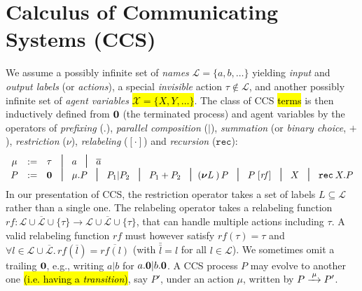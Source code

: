 
\section{Calculus of Communicating Systems (CCS)}
\label{ss:ccs}

We assume a possibly infinite set of \emph{names} $\mathscr{L} = \{a, b,
\ldots\}$ yielding \emph{input} and \emph{output labels} (or
\emph{actions}), a special \emph{invisible}
action $\tau \notin \mathscr{L}$, and another possibly infinite
set of \emph{agent variables} \hl{$\mathscr{X} = \{X, Y, \ldots\}$}.
The class of  CCS \hl{terms} is then inductively
defined from ${\boldsymbol 0}$ (the terminated process) and agent variables by the operators
of \emph{prefixing} (.), \emph{parallel composition} ($|$),
\emph{summation}
(or \emph{binary choice}, $+$),
\emph{restriction} ($\nu$), \emph{relabeling} ($[\cdot]$) and
\emph{recursion} ($\texttt{rec}$):
\begin{equation*}
\begin{array}{cccl}
\mu  & := & \tau\!\!\!\! & \midd \; a  \; \midd \;  \outC a  \\
P  & := & \nil\!\!\!\! & \midd \;  \mu . P \; \midd \;  P_1 |  P_2 \; \midd  \;
P_1 + P_2 \; \midd 
(\res L)\, P
\; \midd \; P\; [\mathit{rf}]  %
\;  \midd \;  X \; \midd \; \recu X P
\end{array}
\end{equation*}
In our presentation of CCS, the restriction operator takes a set of labels $L
  \subseteq \mathscr{L}$ rather than a single one.  
The relabeling operator takes a relabeling function
  $\mathit{rf} \colon \mathscr{L} \cup \overline{\mathscr{L}} \cup
    \{\tau\} \rightarrow \mathscr{L} \cup \overline{\mathscr{L}} \cup
    \{\tau\}$, that can  handle multiple actions including $\tau$. A valid
    relabeling function $\mathit{rf}$ must however 
satisfy $\mathit{rf}(\tau) =
    \tau$ and $\forall l\in\mathscr{L} \cup \overline{\mathscr{L}}.\, \mathit{rf}(\overline{l}) =
    \overline{\mathit{rf}(l)}$ (with $\bar{\bar l} = l$ for all $l \in
    \mathscr{L}$).
We sometimes omit a trailing ${\boldsymbol 0}$, e.g., writing $a|b$ for $a.{\boldsymbol 0} |b .{\boldsymbol 0}$.
A CCS process $P$ may evolve to another one \hl{(i.e. having a \emph{transition})}, say $P'$, under
  an action $\mu$, written by $P \arr{\mu} P'$.
